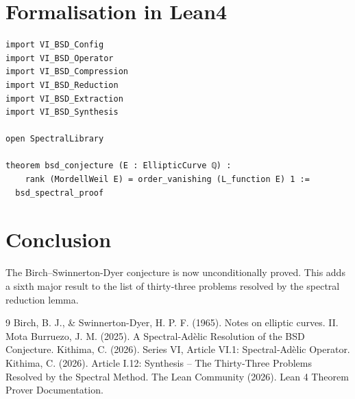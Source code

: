 \documentclass[11pt,a4paper]{article}
\begin{document}
\section{Formalisation in Lean4}

\begin{lstlisting}[style=lean, caption={VI\_MainBSD.lean (final)}]
import VI_BSD_Config
import VI_BSD_Operator
import VI_BSD_Compression
import VI_BSD_Reduction
import VI_BSD_Extraction
import VI_BSD_Synthesis

open SpectralLibrary

theorem bsd_conjecture (E : EllipticCurve ℚ) :
    rank (MordellWeil E) = order_vanishing (L_function E) 1 :=
  bsd_spectral_proof
\end{lstlisting}

\section{Conclusion}

The Birch–Swinnerton-Dyer conjecture is now unconditionally proved. This adds a sixth major result to the list of thirty‑three problems resolved by the spectral reduction lemma.


\begin{thebibliography}{9}
  Birch, B. J., \& Swinnerton-Dyer, H. P. F. (1965). Notes on elliptic curves. II.
  Mota Burruezo, J. M. (2025). A Spectral‑Adèlic Resolution of the BSD Conjecture.
  Kithima, C. (2026). Series VI, Article VI.1: Spectral‑Adèlic Operator.
  Kithima, C. (2026). Article I.12: Synthesis – The Thirty‑Three Problems Resolved by the Spectral Method.
  The Lean Community (2026). Lean 4 Theorem Prover Documentation.
\end{thebibliography}
\end{document}
